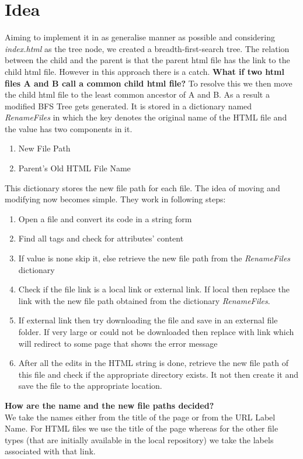\documentclass[11pt]{article}
\begin{document}
\section{Idea}
Aiming to implement it in as generalise manner as possible and considering \textit{index.html} as the tree node, we created a breadth-first-search tree. The relation between the child and the parent is that the parent html file has the link to the child html file.
\newpage
However in this approach there is a catch.
\textbf{What if two html files A and B call a common child html file?} To resolve this we then move the child html file to the least common ancestor of A and B. As a result a modified BFS Tree gets generated. It is stored in a dictionary named \textit{RenameFiles} in which the key denotes the original name of the HTML file and the value has two components in it.
\begin{enumerate}
\item New File Path
\item Parent's Old HTML File Name
\end{enumerate}
This dictionary stores the new file path for each file. The idea of moving and modifying now becomes simple. They work in following steps:
\begin{enumerate}
\item Open a file and convert its code in a string form 
\item Find all tags and check for attributes' content
\item If value is none skip it, else retrieve the new file path from the \textit{RenameFiles} dictionary
\item Check if the file link is a local link or external link. If local then replace the link with the new file path obtained from the dictionary \textit{RenameFiles}.
\item If external link then try downloading the file and save in an external file folder. If very large or could not be downloaded then replace with link which will redirect to some page that shows the error message
\item After all the edits in the HTML string is done, retrieve the new file path of this file and check if the appropriate directory exists. It not then create it and save the file to the appropriate location. 
\end{enumerate}
\textbf{How are the name and the new file paths decided?}\\
We take the names either from the title of the page or from the URL Label Name. For HTML files we use the title of the page whereas for the other file types (that are initially available in the local repository) we take the labels associated with that link.
\end{document}
